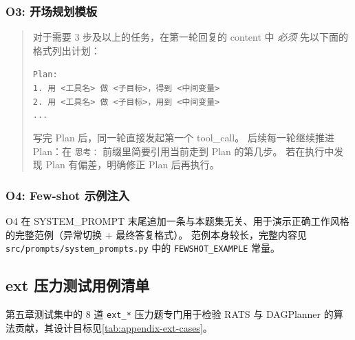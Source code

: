 {    \subsubsection{O3: 开场规划模板}

    \begin{quote}\small
    对于需要 3 步及以上的任务，在第一轮回复的 content 中 \emph{必须} 先以下面的格式列出计划：

    \texttt{Plan:}\\
    \texttt{1. 用 <工具名> 做 <子目标>，得到 <中间变量>}\\
    \texttt{2. 用 <工具名> 做 <子目标>，用到 <中间变量>}\\
    \texttt{...}

    写完 Plan 后，同一轮直接发起第一个 tool\_call。
    后续每一轮继续推进 Plan：在 \texttt{思考：} 前缀里简要引用当前走到 Plan 的第几步。
    若在执行中发现 Plan 有偏差，明确修正 Plan 后再执行。
    \end{quote}

    \subsubsection{O4: Few-shot 示例注入}

    O4 在 SYSTEM\_PROMPT 末尾追加一条与本题集无关、用于演示正确工作风格的完整范例（异常切换 + 最终答复格式）。
    范例本身较长，完整内容见 \texttt{src/prompts/system\_prompts.py} 中的 \texttt{FEWSHOT\_EXAMPLE} 常量。

    \subsection{ext 压力测试用例清单}

    第五章测试集中的 8 道 \texttt{ext\_*} 压力题专门用于检验 RATS 与 DAGPlanner 的算法贡献，其设计目标见\autoref{tab:appendix-ext-cases}。

}
